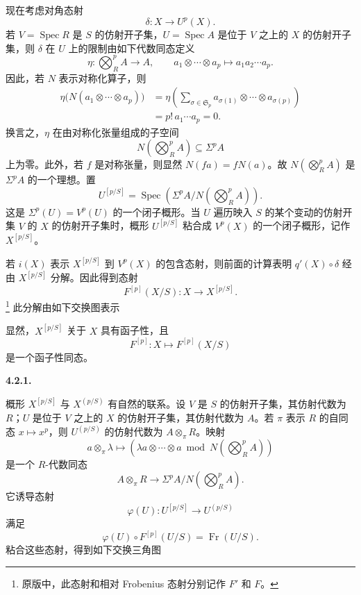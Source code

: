 现在考虑对角态射
\[
  \delta:X\longrightarrow U^p(X).
\]
若 \(V=\operatorname{Spec}R\) 是 \(S\) 的仿射开子集，\(U=\operatorname{Spec}A\) 是位于 \(V\) 之上的 \(X\) 的仿射开子集，则 \(\delta\) 在 \(U\) 上的限制由如下代数同态定义
\[
  \eta:\bigotimes_R^p A\longrightarrow A,
  \qquad
  a_1\otimes\cdots\otimes a_p
  \longmapsto
  a_1a_2\cdots a_p.
\]
因此，若 \(N\) 表示对称化算子，则
\[
\begin{aligned}
  \eta\bigl(N(a_1\otimes\cdots\otimes a_p)\bigr)
  &=
  \eta\left(
    \sum_{\sigma\in\mathfrak S_p}
      a_{\sigma(1)}\otimes\cdots\otimes a_{\sigma(p)}
  \right) \\
  &=
  p!\,a_1\cdots a_p
  =
  0.
\end{aligned}
\]
换言之，\(\eta\) 在由对称化张量组成的子空间
\[
  N\!\left(\bigotimes_R^p A\right)
  \subseteq
  \Sigma^p A
\]
上为零。此外，若 \(f\) 是对称张量，则显然 \(N(fa)=fN(a)\)。故 \(N(\bigotimes_R^p A)\) 是 \(\Sigma^p A\) 的一个理想。置
\[
  U^{[p/S]}
  =
  \operatorname{Spec}\left(
    \Sigma^p A
    \big/
    N\!\left(\bigotimes_R^p A\right)
  \right).
\]
这是 \(\Sigma^p(U)=V^p(U)\) 的一个闭子概形。当 \(U\) 遍历映入 \(S\) 的某个变动的仿射开集 \(V\) 的 \(X\) 的仿射开子集时，概形 \(U^{[p/S]}\) 粘合成 \(V^p(X)\) 的一个闭子概形，记作 \(X^{[p/S]}\)。

若 \(i(X)\) 表示 \(X^{[p/S]}\) 到 \(V^p(X)\) 的包含态射，则前面的计算表明 \(q'(X)\circ\delta\) 经由 \(X^{[p/S]}\) 分解。因此得到态射
\[
  F^{[p]}(X/S):X\longrightarrow X^{[p/S]}.
\]
\footnote{原版中，此态射和相对 Frobenius 态射分别记作 \(F'\) 和 \(F\)。}
此分解由如下交换图表示
\begin{center}
  \label{sga3:VIIA:4.2-pfold-symmetric-factorization}
  
\end{center}
显然，\(X^{[p/S]}\) 关于 \(X\) 具有函子性，且
\[
  F^{[p]}:X\longmapsto F^{[p]}(X/S)
\]
是一个函子性同态。

\medskip
\noindent\textbf{4.2.1.}
\label{sga3:VIIA:4.2.1}

概形 \(X^{[p/S]}\) 与 \(X^{(p/S)}\) 有自然的联系。设 \(V\) 是 \(S\) 的仿射开子集，其仿射代数为 \(R\)；\(U\) 是位于 \(V\) 之上的 \(X\) 的仿射开子集，其仿射代数为 \(A\)。若 \(\pi\) 表示 \(R\) 的自同态 \(x\mapsto x^p\)，则 \(U^{(p/S)}\) 的仿射代数为 \(A\otimes_\pi R\)。映射
\[
  a\otimes_\pi\lambda
  \longmapsto
  \left(
    \lambda a\otimes\cdots\otimes a
    \bmod
    N\!\left(\bigotimes_R^p A\right)
  \right)
\]
是一个 \(R\)-代数同态
\[
  A\otimes_\pi R
  \longrightarrow
  \Sigma^p A\big/
    N\!\left(\bigotimes_R^p A\right).
\]
它诱导态射
\[
  \varphi(U):U^{[p/S]}\longrightarrow U^{(p/S)}
\]
满足
\[
  \varphi(U)\circ F^{[p]}(U/S)=\operatorname{Fr}(U/S).
\]
粘合这些态射，得到如下交换三角图
\begin{center}
  \label{sga3:VIIA:4.2.1-phi-frobenius-triangle}
  
\end{center}

